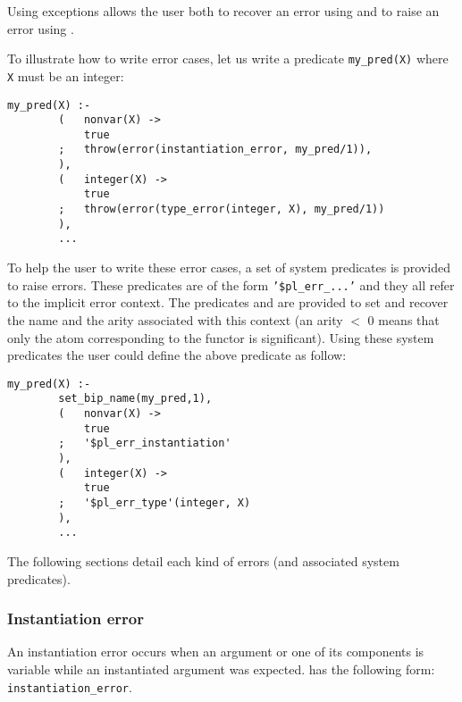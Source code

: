 Using exceptions allows the user both to recover an error using
  and to raise an error using
 . 

To illustrate how to write error cases, let us write a predicate
\texttt{my\_pred(X)} where \texttt{X} must be an integer:

\begin{Indentation}
\begin{verbatim}
my_pred(X) :-
        (   nonvar(X) ->
            true
        ;   throw(error(instantiation_error, my_pred/1)),
        ),
        (   integer(X) ->
            true
        ;   throw(error(type_error(integer, X), my_pred/1))
        ),
        ...
\end{verbatim}
\end{Indentation}

To help the user to write these error cases, a set of system predicates is
provided to raise errors. These predicates are of the form
\texttt{'\$pl\_err\_...'} and they all refer to the implicit error context.
The predicates   and
  are provided to
set and recover the name and the arity associated with this context (an arity
$<$ 0 means that only the atom corresponding to the functor is significant).
Using these system predicates the user could define the above predicate as
follow:

\begin{Indentation}
\begin{verbatim}
my_pred(X) :-
        set_bip_name(my_pred,1),
        (   nonvar(X) ->
            true
        ;   '$pl_err_instantiation'
        ),
        (   integer(X) ->
            true
        ;   '$pl_err_type'(integer, X)
        ),
        ...
\end{verbatim}
\end{Indentation}

The following sections detail each kind of errors (and associated system
predicates).

\subsubsection{Instantiation error}
\label{Instantiation-error}
An instantiation error occurs when an argument or one of its components is
variable while an instantiated argument was expected.
 has the following form:
\texttt{instantiation\_error}.


